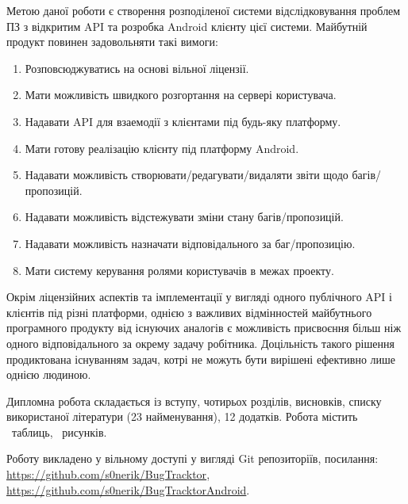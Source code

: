 \documentclass[../main.tex]{subfiles}
\begin{document}
Метою даної роботи є створення розподіленої системи відслідковування проблем ПЗ з відкритим API та розробка Android клієнту цієї системи. Майбутній продукт повинен задовольняти такі вимоги:
\begin{enumerate}
\item Розповсюджуватись на основі вільної ліцензії.
\item Мати можливість швидкого розгортання на сервері користувача.
\item Надавати API для взаемодії з клієнтами під будь-яку платформу.
\item Мати готову реалізацію клієнту під платформу Android.
\item Надавати можливість створювати/редагувати/видаляти звіти щодо багів/пропозицій.
\item Надавати можливість відстежувати зміни стану багів/пропозицій.
\item Надавати можливість назначати відповідального за баг/пропозицію.
\item Мати систему керування ролями користувачів в межах проекту.
\end{enumerate}

Окрім ліцензійних аспектів та імплементації у вигляді одного публічного API і клієнтів під різні платформи, однією з важливих відмінностей майбутнього програмного продукту від існуючих аналогів є можливість присвоєння більш ніж одного відповідального за окрему задачу робітника. Доцільність такого рішення продиктована існуванням задач, котрі не можуть бути вирішені ефективно лише однією людиною.

Дипломна робота складається із вступу, чотирьох розділів, висновків, списку використаної літератури (23 найменування), 12 додатків. Робота містить \totaltables\ таблиць, \totalfigures\  рисунків.

Роботу викладено у вільному доступі у вигляді Git репозиторіїв, посилання: \url{https://github.com/s0nerik/BugTracktor}, \url{https://github.com/s0nerik/BugTracktorAndroid}.
\end{document}
